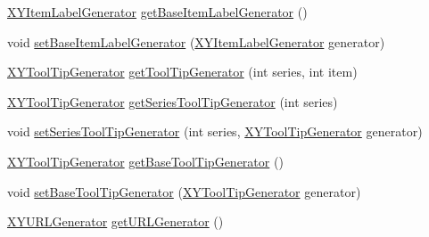 \begin{DoxyCompactItemize}
\item 
\mbox{\hyperlink{interfaceorg_1_1jfree_1_1chart_1_1labels_1_1_x_y_item_label_generator}{X\+Y\+Item\+Label\+Generator}} \mbox{\hyperlink{classorg_1_1jfree_1_1chart_1_1renderer_1_1xy_1_1_abstract_x_y_item_renderer_afee247586678303556027473d842c91b}{get\+Base\+Item\+Label\+Generator}} ()
\item 
void \mbox{\hyperlink{classorg_1_1jfree_1_1chart_1_1renderer_1_1xy_1_1_abstract_x_y_item_renderer_a579128c27e51f1fa12ed95798abfa222}{set\+Base\+Item\+Label\+Generator}} (\mbox{\hyperlink{interfaceorg_1_1jfree_1_1chart_1_1labels_1_1_x_y_item_label_generator}{X\+Y\+Item\+Label\+Generator}} generator)
\item 
\mbox{\hyperlink{interfaceorg_1_1jfree_1_1chart_1_1labels_1_1_x_y_tool_tip_generator}{X\+Y\+Tool\+Tip\+Generator}} \mbox{\hyperlink{classorg_1_1jfree_1_1chart_1_1renderer_1_1xy_1_1_abstract_x_y_item_renderer_a311620b0daf12b3b8eec598b4d99e93d}{get\+Tool\+Tip\+Generator}} (int series, int item)
\item 
\mbox{\hyperlink{interfaceorg_1_1jfree_1_1chart_1_1labels_1_1_x_y_tool_tip_generator}{X\+Y\+Tool\+Tip\+Generator}} \mbox{\hyperlink{classorg_1_1jfree_1_1chart_1_1renderer_1_1xy_1_1_abstract_x_y_item_renderer_a3c3f7975bbf00e6cc660138ce51f517c}{get\+Series\+Tool\+Tip\+Generator}} (int series)
\item 
void \mbox{\hyperlink{classorg_1_1jfree_1_1chart_1_1renderer_1_1xy_1_1_abstract_x_y_item_renderer_ad8d45b15b9f1e83e417bbf84fb542058}{set\+Series\+Tool\+Tip\+Generator}} (int series, \mbox{\hyperlink{interfaceorg_1_1jfree_1_1chart_1_1labels_1_1_x_y_tool_tip_generator}{X\+Y\+Tool\+Tip\+Generator}} generator)
\item 
\mbox{\hyperlink{interfaceorg_1_1jfree_1_1chart_1_1labels_1_1_x_y_tool_tip_generator}{X\+Y\+Tool\+Tip\+Generator}} \mbox{\hyperlink{classorg_1_1jfree_1_1chart_1_1renderer_1_1xy_1_1_abstract_x_y_item_renderer_a9c3702b29c250e9f75066e367c65cd5a}{get\+Base\+Tool\+Tip\+Generator}} ()
\item 
void \mbox{\hyperlink{classorg_1_1jfree_1_1chart_1_1renderer_1_1xy_1_1_abstract_x_y_item_renderer_aff6e3670d0799d590158695fe311a337}{set\+Base\+Tool\+Tip\+Generator}} (\mbox{\hyperlink{interfaceorg_1_1jfree_1_1chart_1_1labels_1_1_x_y_tool_tip_generator}{X\+Y\+Tool\+Tip\+Generator}} generator)
\item 
\mbox{\hyperlink{interfaceorg_1_1jfree_1_1chart_1_1urls_1_1_x_y_u_r_l_generator}{X\+Y\+U\+R\+L\+Generator}} \mbox{\hyperlink{classorg_1_1jfree_1_1chart_1_1renderer_1_1xy_1_1_abstract_x_y_item_renderer_aa1506305a9de8a51ac84b1e520169ace}{get\+U\+R\+L\+Generator}} ()

\end{DoxyCompactItemize}
